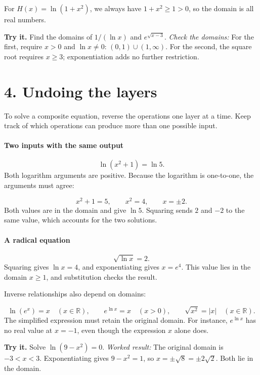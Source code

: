 \documentclass[11pt,letterpaper]{article}
\begin{document}
For \(H(x)=\ln(1+x^2)\), we always have \(1+x^2\geq1>0\), so the domain is all real numbers.

\textbf{Try it.} Find the domains of \(1/(\ln x)\) and \(e^{\sqrt{x-3}}\).
\textit{Check the domains:} For the first, require \(x>0\) and \(\ln x\ne0\): \((0,1)\cup(1,\infty)\). For the second, the square root requires \(x\geq3\); exponentiation adds no further restriction.







\section*{4. Undoing the layers}
To solve a composite equation, reverse the operations one layer at a time. Keep track of which operations can produce more than one possible input.


\paragraph{Two inputs with the same output} \[\ln(x^2+1)=\ln5.\]Both logarithm arguments are positive. Because the logarithm is one-to-one, the arguments must agree:

\[x^2+1=5,\qquad x^2=4,\qquad x=\pm2.\]Both values are in the domain and give \(\ln5\). Squaring sends \(2\) and \(-2\) to the same value, which accounts for the two solutions.




\paragraph{A radical equation} \[\sqrt{\ln x}=2.\]Squaring gives \(\ln x=4\), and exponentiating gives \(x=e^4\). This value lies in the domain \(x\geq1\), and substitution checks the result.



Inverse relationships also depend on domains:

\[\ln(e^x)=x\quad(x\in\mathbb R),\qquad e^{\ln x}=x\quad(x>0),\qquad\sqrt{x^2}=|x|\quad(x\in\mathbb R).\]The simplified expression must retain the original domain. For instance, \(e^{\ln x}\) has no real value at \(x=-1\), even though the expression \(x\) alone does.

\textbf{Try it.} Solve \(\ln(9-x^2)=0\).
\textit{Worked result:} The original domain is \(-3<x<3\). Exponentiating gives \(9-x^2=1\), so \(x=\pm\sqrt8=\pm2\sqrt2\). Both lie in the domain.
\end{document}
